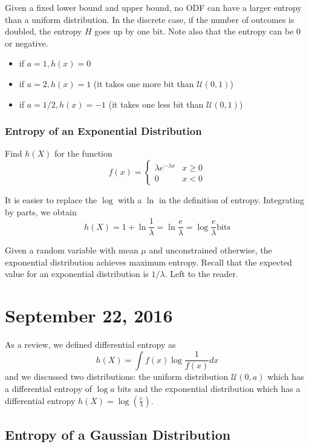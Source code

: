 \documentclass[11pt]{article}
\theoremstyle{definition}
\begin{document}
\theorem Given a fixed lower bound and upper bound, no ODF can have a larger entropy than a uniform distribution. In the discrete case, if the number of outcomes is doubled, the entropy $H$ goes up by one bit. Note also that the entropy can be 0 or negative.
\begin{itemize}
\item if $a = 1, h(x) = 0$
\item if $a = 2, h(x) = 1$ (it takes one more bit than $\mathcal{U}(0, 1)$)
\item if $a = 1/2, h(x) = -1$ (it takes one less bit than $\mathcal{U}(0, 1)$)
\end{itemize}

\subsubsection{Entropy of an Exponential Distribution}

\example Find $h(X)$ for the function 
\begin{equation*} f(x) =	 \begin{cases}
								\lambda e^{-\lambda x} & x \geq 0\\
								0 & x < 0 
							\end{cases}
\end{equation*}

\noindent It is easier to replace the $\log$ with a $\ln$ in the definition of entropy. Integrating by parts, we obtain $$h(X) = 1 + \ln \frac{1}{\lambda} = \ln \frac{e}{\lambda} = \log \frac{e}{\lambda} \text{bits} $$

\theorem Given a random variable with mean $\mu$ and unconstrained otherwise, the exponential distribution achieves maximum entropy. Recall that the expected value for an exponential distribution is $1/\lambda$. 
\proof Left to the reader. 

\section{September 22, 2016}

As a review, we defined differential entropy as $$h(X) = \int f(x) \log \frac{1}{f(x)} dx$$and we discussed two distributions: the uniform distribution $\mathcal{U}(0, a)$ which has a differential entropy of $\log a$ bits and the exponential distribution which has a differential entropy $h(X) = \log (\frac{e}{\lambda})$. 

\subsection{Entropy of a Gaussian Distribution}
\end{document}
